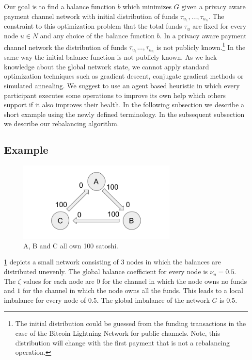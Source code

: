 \documentclass[a4paper]{paper}
\begin{document}
Our goal is to find a balance function $b$ which minimizes $G$ given a privacy aware payment channel network with initial distribution of funds $\tau_{u_1},\dots,\tau_{u_n}$.
The constraint to this optimization problem that the total funds $\tau_u$ are fixed for every node $u \in N$ and any choice of the balance function $b$.
In a privacy aware payment channel network the distribution of funds $\tau_{u_1}\dots,\tau_{u_n}$ is not publicly known.\footnote{The initial distribution could be guessed from the funding transactions in the case of the Bitcoin Lightning Network for public channels. Note, this distribution will change with the first payment that is not a rebalancing operation.}
In the same way the initial balance function is not publicly known.
As we lack knowledge about the global network state, we cannot apply standard optimization techniques such as gradient descent, conjugate gradient methods or simulated annealing.
We suggest to use an agent based heuristic in which every participant executes some operations to improve its own help which others support if it also improves their health.
In the following subsection we describe a short example using the newly defined terminology. In the subsequent subsection we describe our rebalancing algorithm.


\subsection{Example}
\label{sec:example}

\begin{figure}
 \centering
 \includegraphics[width=8cm]{img/evenUnbalanced.png}
 \caption{A, B and C all own 100 satoshi.}
 \label{fig:evenUnbalanced}
\end{figure}

\cref{fig:evenUnbalanced} depicts a small network consisting of $3$ nodes in which the balances are distributed unevenly.
The global balance coefficient for every node is $\nu_u=0.5$.
The $\zeta$ values for each node are $0$ for the channel in which the node owns no funds and $1$ for the channel in which the node owns all the funds.
This leads to a local imbalance for every node of $0.5$. The global imbalance of the network $G$ is $0.5$.
\end{document}
